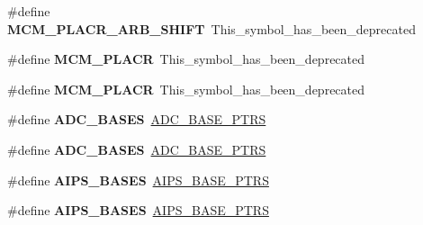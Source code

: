 \begin{DoxyCompactItemize}
\item 
\#define {\bfseries M\+C\+M\+\_\+\+P\+L\+A\+C\+R\+\_\+\+A\+R\+B\+\_\+\+S\+H\+I\+FT}~This\+\_\+symbol\+\_\+has\+\_\+been\+\_\+deprecated\hypertarget{group__Backward__Compatibility__Symbols_ga074aa7cf18e97a20994af9c9f1151873}{}\label{group__Backward__Compatibility__Symbols_ga074aa7cf18e97a20994af9c9f1151873}

\item 
\#define {\bfseries M\+C\+M\+\_\+\+P\+L\+A\+CR}~This\+\_\+symbol\+\_\+has\+\_\+been\+\_\+deprecated\hypertarget{group__Backward__Compatibility__Symbols_gaa410b4b505027d7ff0aab20f87e2c2a5}{}\label{group__Backward__Compatibility__Symbols_gaa410b4b505027d7ff0aab20f87e2c2a5}

\item 
\#define {\bfseries M\+C\+M\+\_\+\+P\+L\+A\+CR}~This\+\_\+symbol\+\_\+has\+\_\+been\+\_\+deprecated\hypertarget{group__Backward__Compatibility__Symbols_gaa410b4b505027d7ff0aab20f87e2c2a5}{}\label{group__Backward__Compatibility__Symbols_gaa410b4b505027d7ff0aab20f87e2c2a5}

\item 
\#define {\bfseries A\+D\+C\+\_\+\+B\+A\+S\+ES}~\hyperlink{group__ADC__Peripheral__Access__Layer_gaaa8175a3a2f4efaceeed5bd26c0b2d3f}{A\+D\+C\+\_\+\+B\+A\+S\+E\+\_\+\+P\+T\+RS}\hypertarget{group__Backward__Compatibility__Symbols_gae0bfd3c32654e1c2ef2188474f7d7d07}{}\label{group__Backward__Compatibility__Symbols_gae0bfd3c32654e1c2ef2188474f7d7d07}

\item 
\#define {\bfseries A\+D\+C\+\_\+\+B\+A\+S\+ES}~\hyperlink{group__ADC__Peripheral__Access__Layer_gaaa8175a3a2f4efaceeed5bd26c0b2d3f}{A\+D\+C\+\_\+\+B\+A\+S\+E\+\_\+\+P\+T\+RS}\hypertarget{group__Backward__Compatibility__Symbols_gae0bfd3c32654e1c2ef2188474f7d7d07}{}\label{group__Backward__Compatibility__Symbols_gae0bfd3c32654e1c2ef2188474f7d7d07}

\item 
\#define {\bfseries A\+I\+P\+S\+\_\+\+B\+A\+S\+ES}~\hyperlink{group__AIPS__Peripheral__Access__Layer_gacdda032ccd174e1d8c1a02b1e0f7a441}{A\+I\+P\+S\+\_\+\+B\+A\+S\+E\+\_\+\+P\+T\+RS}\hypertarget{group__Backward__Compatibility__Symbols_ga9649eb4cdd717b712c299e178d54cfd6}{}\label{group__Backward__Compatibility__Symbols_ga9649eb4cdd717b712c299e178d54cfd6}

\item 
\#define {\bfseries A\+I\+P\+S\+\_\+\+B\+A\+S\+ES}~\hyperlink{group__AIPS__Peripheral__Access__Layer_gacdda032ccd174e1d8c1a02b1e0f7a441}{A\+I\+P\+S\+\_\+\+B\+A\+S\+E\+\_\+\+P\+T\+RS}\hypertarget{group__Backward__Compatibility__Symbols_ga9649eb4cdd717b712c299e178d54cfd6}{}\label{group__Backward__Compatibility__Symbols_ga9649eb4cdd717b712c299e178d54cfd6}


\end{DoxyCompactItemize}
